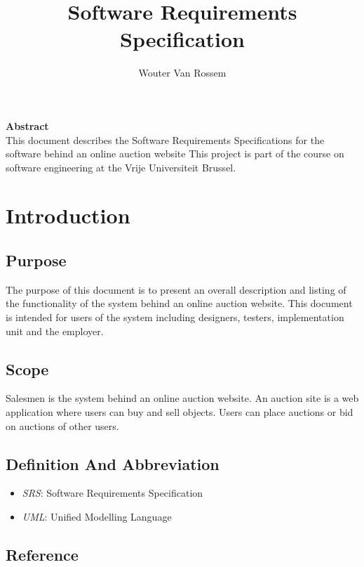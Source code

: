 \documentclass[a4paper, 12pt]{report}
\begin{document}
\title{Software Requirements Specification}
\author{Wouter Van Rossem}
\maketitle
\begin{center}
	\textbf{Abstract} \\
	This document describes the Software Requirements Specifications for
	the software behind an online auction website This project is part of 
	the course on software engineering at the Vrije Universiteit Brussel.
	
\end{center}
\tableofcontents

\chapter{Introduction}
\section{Purpose}
	The purpose of this document is to present an overall description and 
	listing of the functionality of the system behind an online auction 
	website. This document is intended for users of the system including
	designers, testers, implementation unit and the employer.
\section{Scope}
	Salesmen is the system behind an online auction website. An auction site 
	is a web application where users can buy and sell objects. Users can 
	place auctions or bid on auctions of other users. 
\section{Definition And Abbreviation}
	\begin{itemize}
		\item \emph{SRS}: Software Requirements Specification
		\item \emph{UML}: Unified Modelling Language
	\end{itemize}
\section{Reference}
\end{document}
